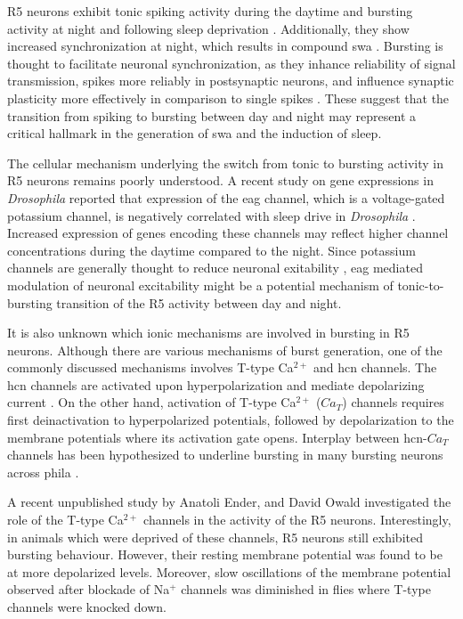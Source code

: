 \documentclass[../main.tex]{subfiles}
\begin{document}
R5 neurons exhibit tonic spiking activity during the daytime and bursting activity at night and following sleep deprivation \cite{liuSleepDriveEncoded2016,raccugliaNetworkSpecificSynchronizationElectrical2019}. Additionally, they show increased synchronization at night, which results in compound \gls{swa} \cite{raccugliaNetworkSpecificSynchronizationElectrical2019}. Bursting is thought to facilitate neuronal synchronization, as they inhance reliability of signal transmission, spikes more reliably in postsynaptic neurons, and influence synaptic plasticity more effectively in comparison to single spikes \parencite{lismanBurstsUnitNeural1997,kimBurstSynchronizationScalefree2019}.
These suggest that the transition from spiking to bursting between day and night may represent a critical hallmark in the generation of \gls{swa} and the induction of sleep.

The cellular mechanism underlying the switch from tonic to bursting activity in R5 neurons remains poorly understood. A recent study on gene expressions in \textit{Drosophila} reported that expression of the \gls{eag} channel, which is a voltage-gated potassium channel, is negatively correlated with sleep drive in \textit{Drosophila} \cite{doppSinglecellTranscriptomicsReveals2024}.
Increased expression of genes encoding these channels may reflect higher channel concentrations during the daytime compared to the night. Since potassium channels are generally thought to reduce neuronal exitability \cite{bruggemannEtheragogoEncodesVoltagegated1993}, \gls{eag} mediated modulation of neuronal excitability might be a potential mechanism of tonic-to-bursting transition of the R5 activity between day and night.

It is also unknown which ionic mechanisms are involved in bursting in R5 neurons. Although there are various mechanisms of burst generation, one of the commonly discussed mechanisms involves T-type Ca$^{2+}$ and \gls{hcn} channels. The \gls{hcn} channels are activated upon hyperpolarization and mediate depolarizing current \cite{destexheModelInwardCurrent1993}. On the other hand, activation of T-type Ca$^{2+}$ ($Ca_T$) channels requires first deinactivation to hyperpolarized potentials, followed by depolarization to the membrane potentials where its activation gate opens. Interplay between \gls{hcn}-$Ca_T$ channels has been hypothesized to underline bursting in many bursting neurons across phila \cite{wangMultipleDynamicalModes1994,liuMultipleConductancesCooperatively2008}.

A recent unpublished study by Anatoli Ender, and David Owald investigated the role of the T-type Ca$^{2+}$ channels in the activity of the R5 neurons. Interestingly, in animals which were deprived of these channels, R5 neurons still exhibited bursting behaviour. However, their resting membrane potential was found to be at more depolarized levels. Moreover, slow oscillations of the membrane potential observed after blockade of Na$^{+}$ channels was diminished in flies where T-type channels were knocked down.
\end{document}
